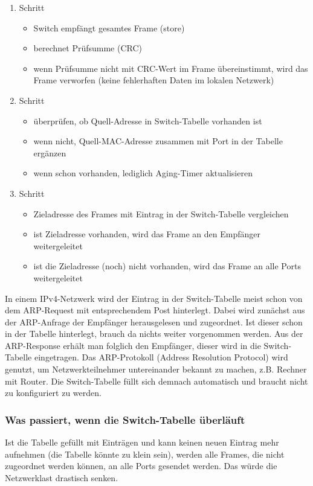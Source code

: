 \begin{enumerate}
\item Schritt
	\begin{itemize}
	\item Switch empfängt gesamtes Frame (store)
	\item berechnet Prüfsumme (CRC)
	\item wenn Prüfsumme nicht mit CRC-Wert im Frame übereinstimmt, wird das Frame verworfen (keine fehlerhaften Daten im lokalen Netzwerk)
	\end{itemize}
\item Schritt
	\begin{itemize}
	\item überprüfen, ob Quell-Adresse in Switch-Tabelle vorhanden ist
	\item wenn nicht, Quell-MAC-Adresse zusammen mit Port in der Tabelle ergänzen
	\item wenn schon vorhanden, lediglich Aging-Timer aktualisieren
	\end{itemize}
\item Schritt
	\begin{itemize}
	\item Zieladresse des Frames mit Eintrag in der Switch-Tabelle vergleichen
	\item ist Zieladresse vorhanden, wird das Frame an den Empfänger weitergeleitet
	\item ist die Zieladresse (noch) nicht vorhanden, wird das Frame an alle Ports weitergeleitet
	\end{itemize}
\end{enumerate}

In einem IPv4-Netzwerk wird der Eintrag in der Switch-Tabelle meist schon von dem ARP-Request mit entsprechendem Post hinterlegt. Dabei wird zunächst aus der ARP-Anfrage der Empfänger herausgelesen und zugeordnet. Ist dieser schon in der Tabelle hinterlegt, brauch da nichts weiter vorgenommen werden. Aus der ARP-Response erhält man folglich den Empfänger, dieser wird in die Switch-Tabelle eingetragen.
Das ARP-Protokoll (Address Resolution Protocol) wird genutzt, um Netzwerkteilnehmer untereinander bekannt zu machen, z.B. Rechner mit Router.
Die Switch-Tabelle füllt sich demnach automatisch und braucht nicht zu konfiguriert zu werden.

\subsubsection{Was passiert, wenn die Switch-Tabelle überläuft}
Ist die Tabelle gefüllt mit Einträgen und kann keinen neuen Eintrag mehr aufnehmen (die Tabelle könnte zu klein sein), werden alle Frames, die nicht zugeordnet werden können, an alle Ports gesendet werden. Das würde die Netzwerklast drastisch senken.